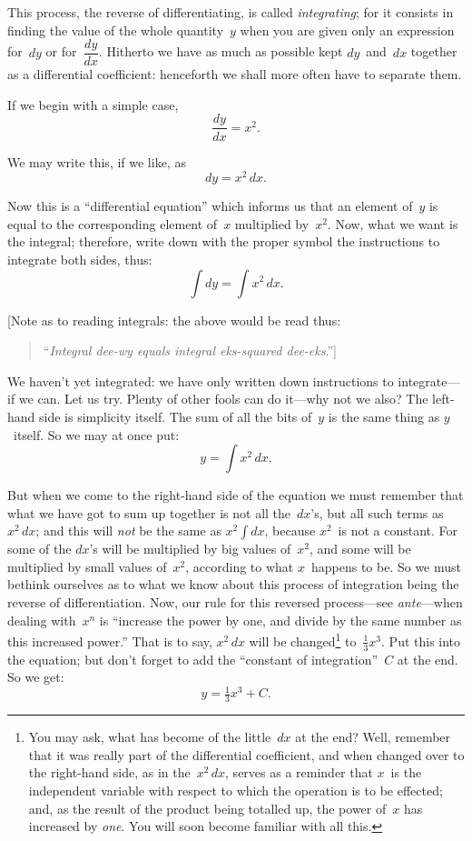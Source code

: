 \documentclass[12pt]{book}[2005/09/16]
\newcommand{\ds}{\displaystyle}
\newcommand{\DPPageSep}[2]{\Pagelabel{#2}}
\newcommand{\Pagelabel}[1]
  {\phantomsection\label{#1}}
\newcommand{\Pageref}[2][p.]{%
  \ifthenelse{\not\equal{#1}{}}{%
    \hyperref[#2]{#1~\pageref{#2}}%
  }{%
    \hyperref[#2]{\pageref{#2}}%
  }%
}
\begin{document}
This process, the reverse of differentiating, is called
\emph{integrating}; for it consists in finding the value of
the whole quantity~$y$ when you are given only an
expression for~$dy$ or for~$\dfrac{dy}{dx}$. Hitherto we have as
much as possible kept $dy$~and~$dx$ together as a differential
coefficient: henceforth we shall more often
have to separate them.

If we begin with a simple case,
\[
\frac{dy}{dx} = x^2.
\]

We may write this, if we like, as
\[
dy = x^2\, dx.
\]

Now this is a  ``differential equation''  which informs
us that an element of~$y$ is equal to the corresponding
element of~$x$ multiplied by~$x^2$. Now, what we want
\DPPageSep{206.png}{194}%
is the integral; therefore, write down with the proper
symbol the instructions to integrate both sides, thus:
\[
\int dy = \int x^2\, dx.
\]

[Note as to reading integrals: the above would be
read thus:
\begin{quote}
``\emph{Integral dee-wy \emph{equals} integral eks-squared dee-eks}.'']
\end{quote}

We haven't yet integrated: we have only written
down instructions to integrate---if we can. Let us
try. Plenty of other fools can do it---why not we
also? The left-hand side is simplicity itself. The
sum of all the bits of~$y$ is the same thing as $y$~itself.
So we may at once put:
\[
y = \int x^2\, dx.
\]

But when we come to the right-hand side of the
equation we must remember that what we have got
to sum up together is not all the~$dx$'s, but all such
terms as~$x^2\, dx$; and this will \emph{not} be the same as
$x^2 \ds\int dx$, because $x^2$~is not a constant. For some of the
$dx$'s will be multiplied by big values of~$x^2$, and some
will be multiplied by small values of~$x^2$, according to
what $x$~happens to be. So we must bethink ourselves
as to what we know about this process of integration
being the reverse of differentiation. Now, our rule
for this reversed process---see \Pageref{revdif} \textit{ante}---when
dealing with~$x^n$ is ``increase the power by one, and\Pagelabel{diffrule}
divide by the same number as this increased power.''
\DPPageSep{207.png}{195}%
That is to say, $x^2\, dx$ will be changed\footnote
  {You may ask, what has become of the little~$dx$ at the end?
  Well, remember that it was really part of the differential coefficient,
  and when changed over to the right-hand side, as in the~$x^2\, dx$,
  serves as a reminder that $x$~is the independent variable with respect
  to which the operation is to be effected; and, as the result of the
  product being totalled up, the power of~$x$ has increased by \emph{one}.
  You will soon become familiar with all this.}
to~$\frac{1}{3} x^3$. Put
this into the equation; but don't forget to add the
``constant of integration''~$C$ at the end. So we get:
\[
y = \tfrac{1}{3} x^3 + C.
\]
\end{document}
